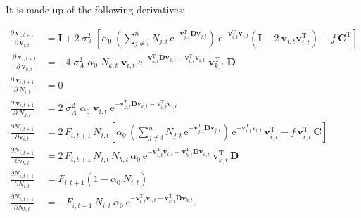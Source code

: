 It is made up of the following derivatives:

\begin{equation*}
\begin{split}
    \frac{ \partial \, \mathbf{v}_{i,t+1} }{ \partial \, \mathbf{v}_{i,t} } &= 
    \mathbf{I} + 2 ~ \sigma_A^2 ~
        \left[
            \alpha_0 ~ \left(
                \sum_{j \ne i}^{n}{ N_{j,t} \, \textrm{e}^{
                - \mathbf{v}_{j,t}^{\textrm{T}}
                \mathbf{D} \mathbf{v}_{j,t} } }
            \right) ~ \textrm{e}^{ - \mathbf{v}_{i,t}^{\textrm{T}} \mathbf{v}_{i,t} }
            \left(
                \mathbf{I} - 2 ~ \mathbf{v}_{i,t} \mathbf{v}_{i,t}^{\textrm{T}}
            \right) -
            f \: \mathbf{C}^{\textrm{T}}
        \right] \\\
% 
    \frac{ \partial \: \mathbf{v}_{i,t+1} }{ \partial \: \mathbf{v}_{k,t}} &=
        -4 \; \sigma_A^2 \; \alpha_0 \; N_{k,t} \; \mathbf{v}_{i,t} \;
        \textrm{e}^{
                    - \mathbf{v}_{k,t}^{\textrm{T}} \mathbf{D} \mathbf{v}_{k,t}
                    - \mathbf{v}_{i,t}^{\textrm{T}} \mathbf{v}_{i,t}
                } \;
        \mathbf{v}_{k,t}^{\textrm{T}} \; \mathbf{D} \\
% 
    \frac{ \partial \: \mathbf{v}_{i,t+1} }{ \partial \: N_{i,t} } &= 0 \\
    \frac{ \partial \: \mathbf{v}_{i,t+1} }{ \partial \: N_{k,t} } &=
        2 \; \sigma_A^2 \; \alpha_0 \; \mathbf{v}_{i,t} \;
        \textrm{e}^{ - \mathbf{v}_{k,t}^{\textrm{T}} \mathbf{D} \mathbf{v}_{k,t}
            - \mathbf{v}_{i,t}^{\textrm{T}} \mathbf{v}_{i,t} } \\
% 
    \frac{ \partial N_{i,t+1} }{ \partial \mathbf{v}_{i,t} } &= 
        2 \, F_{i,t+1} \,  N_{i,t}
        \left[
            \alpha_0 \, \left(
                \sum_{j \ne i}^{n}{ N_{j,t} \, \textrm{e}^{
                - \mathbf{v}_{j,t}^{\textrm{T}}
                \mathbf{D} \mathbf{v}_{j,t} } }
            \right) \, \text{e}^{ -\mathbf{v}_{i,t}^{\text{T}}
            \mathbf{v}_{i,t} } \, \mathbf{v}_{i,t}^{\text{T}}
            - f \, \mathbf{v}_{i,t}^{\text{T}} \, \mathbf{C}
        \right] \\
    \frac{ \partial N_{i,t+1} }{ \partial \mathbf{v}_{k,t} } &= 
        2 \, F_{i,t+1} \, N_{i,t} \, N_{k,t} \, \alpha_0 \: 
        \text{e}^{ -\mathbf{v}_{i,t}^{\text{T}} \mathbf{v}_{i,t} -
            \mathbf{v}_{k,t}^{\text{T}} \mathbf{D} \mathbf{v}_{k,t} } \:
        \mathbf{v}_{k,t}^{\text{T}} \, \mathbf{D} \\
% 
    \frac{ \partial N_{i,t+1} }{ \partial N_{i,t} } &= 
        F_{i,t+1} \left( 1 - \alpha_0 \: N_{i,t} \right) \\
    \frac{ \partial N_{i,t+1} }{ \partial N_{k,t} } &= 
        - F_{i,t+1} \: N_{i,t} \: \alpha_0 \: 
        \text{e}^{ -\mathbf{v}_{i,t}^{\text{T}} \mathbf{v}_{i,t} -
            \mathbf{v}_{k,t}^{\text{T}} \mathbf{D} \mathbf{v}_{k,t} } 
    \textrm{.}
\end{split}
\end{equation*}







